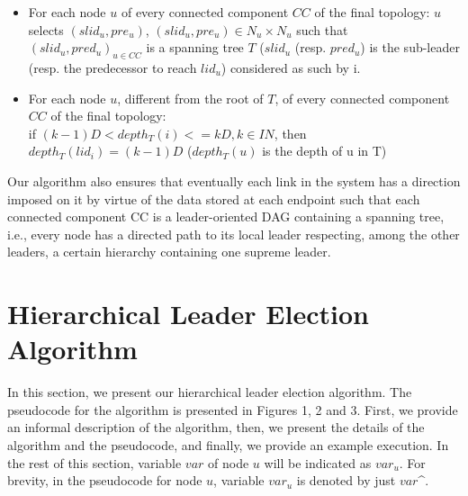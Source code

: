 \documentclass{article}
\begin{document}
\begin{itemize}
\item For each node $ u $ of every connected component $CC$ of the final topology:
$u$ selects $(slid_u, pre_u)$, ${(slid_u, pre_u) \in N_u \times N_u}$ such that ${(slid_u, pred_u)}_{u \in CC}$ is a spanning tree $T$ ($slid_u$ (resp. $pred_u$) is the sub-leader (resp. the predecessor to reach $lid_u$) considered as such by i.
\item For each node $u$, different from the root of $T$, of every connected component $CC$ of the final topology:\\
if $ (k-1)D < depth_T (i) <= kD, k \in IN $, then $ depth_T(lid_i)=(k-1)D$ ($depth_T(u)$ is the depth of u in T)
\end{itemize}



Our algorithm also ensures that eventually each link in the system has a direction imposed on it by virtue of the data stored at each endpoint such that each connected component CC is a leader-oriented DAG containing a spanning tree, i.e., every node has a directed path to its local leader respecting, among the other leaders, a certain hierarchy containing one supreme leader.

\newpage
\section{Hierarchical Leader Election Algorithm}
In this section, we present our hierarchical leader election algorithm. The pseudocode for the algorithm is presented in Figures 1, 2 and 3. First, we provide an informal description of the algorithm, then, we present the details of the algorithm and the pseudocode, and finally, we provide an example execution. In the rest of this section, variable $var$ of node $u$ will be indicated as $var_u$. For brevity, in the pseudocode for node $u$, variable $var_u$ is denoted by just $var$^.
\end{document}
